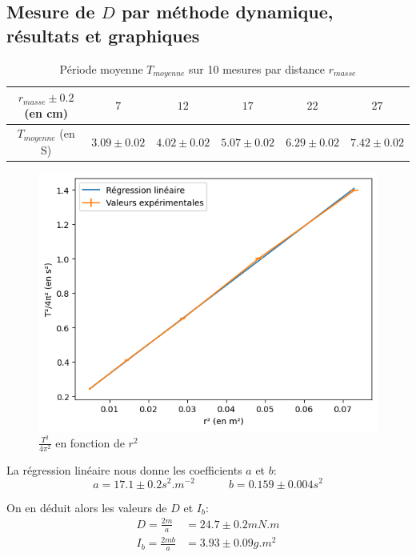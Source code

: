 \documentclass[12pt]{article}
\begin{document}
\subsection{Mesure de $D$ par méthode dynamique, résultats et graphiques}
\label{section:D_dynamique}
\begin{table}[h!]
	\centering
	\begin{tabular}{||c | c c c c c||} 
		\hline
		$r_{masse} \pm 0.2$ (en cm) & $7$ & $12$ & $17$ & $22$ & $27$ \\
		\hline
        $T_{moyenne}$ (en S) & $3.09 \pm 0.02$ & $4.02 \pm 0.02$ & $5.07 \pm 0.02$ & $6.29 \pm 0.02$ & $7.42 \pm 0.02$\\
        \hline
    \end{tabular}
	\caption{Période moyenne $T_{moyenne}$ sur 10 mesures par distance $r_{masse}$}
	\label{table:mesure_D_dynamique}
\end{table}
\begin{figure}[h!]
    \begin{center}
        \includegraphics*[scale=1]{img/D_dynamique.png}
    \end{center}
    \caption{$\frac{T^2}{4\pi^2}$ en fonction de $r^2$}
    \label{fig:graphe_T}
\end{figure}

La régression linéaire nous donne les coefficients $a$ et $b$:
\begin{equation}
    a = 17.1 \pm 0.2 s^2.m^{-2} \quad \quad \quad b = 0.159 \pm 0.004 s^2
\end{equation}

On en déduit alors les valeurs de $D$ et $I_b$:
\begin{align*}
    D = \frac{2m}{a} & = 24.7 \pm 0.2 mN.m \\
    I_b = \frac{2mb}{a} & = 3.93 \pm 0.09 g.m^2 %
\end{align*}
\end{document}
